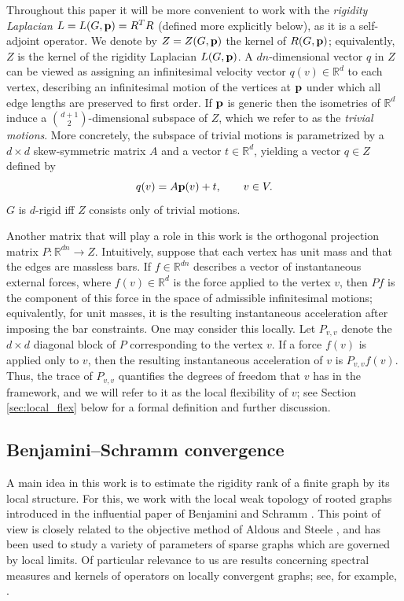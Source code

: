 \documentclass[reqno,english]{amsart}
\numberwithin{equation}{section}
\theoremstyle{definition}{
\newtheorem{example}[theorem]{Example}
\newtheorem{definition}[theorem]{Definition}
\newtheorem*{definition*}{Definition}
\newtheorem{problem}[theorem]{Problem}
\newtheorem{question}[theorem]{Question}
}
\newcommand{\R}{\mathbb R}
\newcommand{\p}{{\bf p}}
\begin{document}
Throughout this paper it will be more convenient to work with the {\em rigidity Laplacian} $L=L(G,\p)=R^TR$ (defined more explicitly below), as it is a self-adjoint operator.
We denote by $Z=Z(G,\p)$ the kernel of $R(G,\p)$; equivalently, $Z$ is the kernel of the rigidity Laplacian $L(G,\p)$. 
A \(dn\)-dimensional vector \(q\) in \(Z\) can be viewed as assigning an
infinitesimal velocity vector \(q(v)\in\R^d\) to each vertex, describing
an infinitesimal motion of the vertices at \(\p\) under which all edge
lengths are preserved to first order. If \(\p\) is generic then the
isometries of \(\R^d\) induce a \(\binom{d+1}{2}\)-dimensional subspace of
\(Z\), which we refer to as the {\em trivial motions}. More concretely, the
subspace of trivial motions is parametrized by a \(d\times d\)
skew-symmetric matrix \(A\) and a vector \(t\in\R^d\), yielding a vector
\(q\in Z\) defined by
\[
q(v)=A\p(v)+t,\qquad v\in V.
\]
$G$ is $d$-rigid iff $Z$ consists only of trivial motions. 

Another matrix that will play a role in this work is the orthogonal
projection matrix \(P:\R^{dn}\to Z\). Intuitively, suppose that each vertex
has unit mass and that the edges are massless bars. If \(f\in \R^{dn}\) describes a vector of instantaneous external forces,
where \(f(v)\in\R^d\) is the force applied to the vertex \(v\), then
\(Pf\) is the component of this force in the space of admissible
infinitesimal motions; equivalently, for unit masses, it is the resulting
instantaneous acceleration after imposing the bar constraints.
One may consider this locally. Let \(P_{v,v}\) denote the
\(d\times d\) diagonal block of \(P\) corresponding to the vertex \(v\).
If a force \(f(v)\) is applied only to \(v\), then the resulting
instantaneous acceleration of \(v\) is
$P_{v,v} f(v).$ Thus, the trace of $P_{v,v}$ quantifies the degrees of freedom that $v$ has in the framework, and we will refer to it as the local flexibility of $v$; see Section \ref{sec:local_flex} below for a formal definition and further discussion.

\subsection{Benjamini--Schramm convergence}
A main idea in this work is to estimate the rigidity rank of a finite graph by its local structure. 
For this, we work with the local weak topology of rooted graphs introduced in the influential paper 
of Benjamini and Schramm \cite{BenjaminiSchramm2001}. 
This point of view is closely related to the objective method of Aldous and Steele
\cite{AldousSteeleObjectiveMethod}, and has been used to study a variety of
parameters of sparse graphs which are governed by local limits. Of particular
relevance to us are results concerning spectral measures and kernels of
operators on locally convergent graphs; see, for example,
\cite{AbertThomViragSpectralMeasure,BordenaveLelarge2010,BordenaveLelargeSalezDiluted}.
\end{document}
